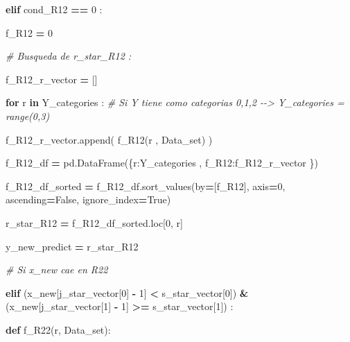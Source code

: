 \documentclass[
  11pt,
  a4paper,
]{article}
\newenvironment{Shaded}{\begin{snugshade}}{\end{snugshade}}
\newcommand{\CommentTok}[1]{\textcolor[rgb]{0.56,0.35,0.01}{\textit{#1}}}
\newcommand{\ControlFlowTok}[1]{\textcolor[rgb]{0.13,0.29,0.53}{\textbf{#1}}}
\newcommand{\DecValTok}[1]{\textcolor[rgb]{0.00,0.00,0.81}{#1}}
\newcommand{\KeywordTok}[1]{\textcolor[rgb]{0.13,0.29,0.53}{\textbf{#1}}}
\newcommand{\NormalTok}[1]{#1}
\newcommand{\OperatorTok}[1]{\textcolor[rgb]{0.81,0.36,0.00}{\textbf{#1}}}
\newcommand{\StringTok}[1]{\textcolor[rgb]{0.31,0.60,0.02}{#1}}
\newcommand{\VariableTok}[1]{\textcolor[rgb]{0.00,0.00,0.00}{#1}}
\begin{document}
\begin{Shaded}
\begin{Highlighting}[]
            
                    \ControlFlowTok{elif}\NormalTok{ cond\_R12 }\OperatorTok{==} \DecValTok{0}\NormalTok{ :}

\NormalTok{                        f\_R12 }\OperatorTok{=} \DecValTok{0}

                
            \CommentTok{\# Busqueda de r\_star\_R12 :}

\NormalTok{                f\_R12\_r\_vector }\OperatorTok{=}\NormalTok{ []}

                \ControlFlowTok{for}\NormalTok{ r }\KeywordTok{in}\NormalTok{ Y\_categories :  }\CommentTok{\# Si Y tiene como categorias 0,1,2 {-}{-}\textgreater{} Y\_categories = range(0,3)}

\NormalTok{                    f\_R12\_r\_vector.append( f\_R12(r , Data\_set) )}

\NormalTok{                f\_R12\_df }\OperatorTok{=}\NormalTok{ pd.DataFrame(\{}\StringTok{\textquotesingle{}r\textquotesingle{}}\NormalTok{:Y\_categories  , }\StringTok{\textquotesingle{}f\_R12\textquotesingle{}}\NormalTok{:f\_R12\_r\_vector \})}
        
\NormalTok{                f\_R12\_df\_sorted }\OperatorTok{=}\NormalTok{ f\_R12\_df.sort\_values(by}\OperatorTok{=}\NormalTok{[}\StringTok{\textquotesingle{}f\_R12\textquotesingle{}}\NormalTok{], axis}\OperatorTok{=}\DecValTok{0}\NormalTok{, ascending}\OperatorTok{=}\VariableTok{False}\NormalTok{, ignore\_index}\OperatorTok{=}\VariableTok{True}\NormalTok{)}

\NormalTok{                r\_star\_R12 }\OperatorTok{=}\NormalTok{ f\_R12\_df\_sorted.loc[}\DecValTok{0}\NormalTok{, }\StringTok{\textquotesingle{}r\textquotesingle{}}\NormalTok{]}


\NormalTok{                y\_new\_predict }\OperatorTok{=}\NormalTok{ r\_star\_R12}



            
            \CommentTok{\# Si x\_new cae en R22}

            \ControlFlowTok{elif}\NormalTok{ (x\_new[j\_star\_vector[}\DecValTok{0}\NormalTok{] }\OperatorTok{{-}} \DecValTok{1}\NormalTok{] }\OperatorTok{\textless{}}\NormalTok{ s\_star\_vector[}\DecValTok{0}\NormalTok{]) }\OperatorTok{\&}\NormalTok{ (x\_new[j\_star\_vector[}\DecValTok{1}\NormalTok{] }\OperatorTok{{-}} \DecValTok{1}\NormalTok{] }\OperatorTok{\textgreater{}=}\NormalTok{ s\_star\_vector[}\DecValTok{1}\NormalTok{])  :}

                
                \KeywordTok{def}\NormalTok{ f\_R22(r, Data\_set):}


\end{Highlighting}
\end{Shaded}
\end{document}
